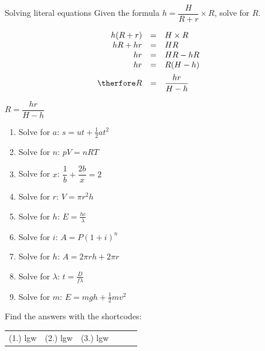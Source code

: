 \begin{wex}
{Solving literal equations}
{
Given the formula $h=\dfrac{H}{R+r} \times R$, solve for $R$.
}
{
\begin{equation*}
    \begin{array}{ccll}\hfill h(R+r)& =& H \times R\hfill & \\
	\hfill hR + hr& =& HR\hfill & \hfill \\
	\hfill hr & =& HR - hR\hfill \\
\hfill hr& =& R(H - h)\hfill \vspace{5pt}\\ 
\hfill \therfore R & =& \dfrac{hr}{H-h}\hfill 
    \end{array}
\end{equation*}

$R = \dfrac{hr}{H-h}$
} 
\end{wex}


\begin{exercises}{}
{
\begin{enumerate}[noitemsep, label=\textbf{\arabic*}. ] 
\item Solve for $a$: $s=ut+\frac{1}{2}at^{2}$
\item Solve for $n$: $pV=nRT$ \vspace{5pt}
\item Solve for $x$: $\dfrac{1}{b}+\dfrac{2b}{x}=2$\vspace{5pt}
\item Solve for $r$: $V = \pi r^{2} h$
\item Solve for $h$: $E=\frac{hc}{\lambda}$
\item Solve for $i$: $A=P(1+i)^{n}$
\item Solve for $h$: $A=2\pi rh + 2 \pi r$
\item Solve for $\lambda$: $t=\frac{D}{f \lambda}$
\item Solve for $m$: $E=mgh + \frac{1}{2}mv^{2}$
\end{enumerate}

\par {} Find the answers with the shortcodes:
\par \begin{tabular}[h]{cccccc}
(1.) lgw  &  (2.) lgw  &  (3.) lgw  & \end{tabular}
}
\end{exercises}

